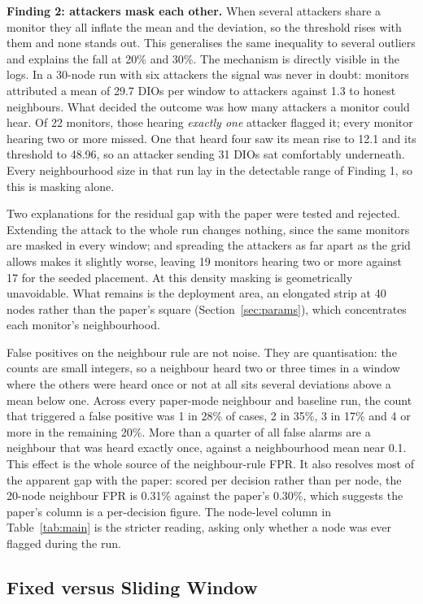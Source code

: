 \documentclass[11pt, a4paper]{article}
\begin{document}
\textbf{Finding 2: attackers mask each other.} When several attackers share a monitor they all inflate the mean and the deviation, so the threshold rises with them and none stands out. This generalises the same inequality to several outliers and explains the fall at 20\% and 30\%. The mechanism is directly visible in the logs. In a 30-node run with six attackers the signal was never in doubt: monitors attributed a mean of 29.7 DIOs per window to attackers against 1.3 to honest neighbours. What decided the outcome was how many attackers a monitor could hear. Of 22 monitors, those hearing \textit{exactly one} attacker flagged it; every monitor hearing two or more missed. One that heard four saw its mean rise to 12.1 and its threshold to 48.96, so an attacker sending 31 DIOs sat comfortably underneath. Every neighbourhood size in that run lay in the detectable range of Finding 1, so this is masking alone.

Two explanations for the residual gap with the paper were tested and rejected. Extending the attack to the whole run changes nothing, since the same monitors are masked in every window; and spreading the attackers as far apart as the grid allows makes it slightly worse, leaving 19 monitors hearing two or more against 17 for the seeded placement. At this density masking is geometrically unavoidable. What remains is the deployment area, an elongated strip at 40 nodes rather than the paper's square (Section~\ref{sec:params}), which concentrates each monitor's neighbourhood.

False positives on the neighbour rule are not noise. They are quantisation: the counts are small integers, so a neighbour heard two or three times in a window where the others were heard once or not at all sits several deviations above a mean below one. Across every paper-mode neighbour and baseline run, the count that triggered a false positive was 1 in 28\% of cases, 2 in 35\%, 3 in 17\% and 4 or more in the remaining 20\%. More than a quarter of all false alarms are a neighbour that was heard exactly once, against a neighbourhood mean near 0.1. This effect is the whole source of the neighbour-rule FPR. It also resolves most of the apparent gap with the paper: scored per decision rather than per node, the 20-node neighbour FPR is 0.31\% against the paper's 0.30\%, which suggests the paper's column is a per-decision figure. The node-level column in Table~\ref{tab:main} is the stricter reading, asking only whether a node was ever flagged during the run.

\subsection{Fixed versus Sliding Window}
\label{sec:sliding}
\end{document}
